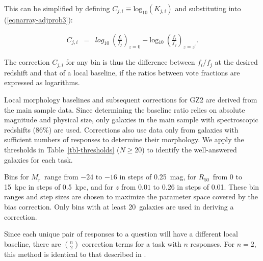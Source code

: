 \documentclass[useAMS,usenatbib]{mn2e}
\newcommand{\mr}{$M_r$}
\newcommand{\rfifty}{$R_{50}$}
\newcommand{\redshift}{$z$}
\begin{document}
\noindent This can be simplified by defining $C_{j,i}\equiv\text{log}_{10}(K_{j,i})$ and substituting into (\ref{eqnarray-adjprob3}):

\begin{eqnarray}
C_{j,i} &=& \text{$log_{10}$}~\left(\frac{f_i}{f_j}\right)_{z=0} - \text{log$_{10}$}~\left(\frac{f_i}{f_j}\right)_{z=z^\prime}.
\label{eqnarray-adjprob4}
\end{eqnarray}

\noindent The correction $C_{j,i}$ for any bin is thus the difference between $f_i/f_j$ at the desired redshift and that of a local baseline, if the ratios between vote fractions are expressed as logarithms.  

Local morphology baselines and subsequent corrections for GZ2 are derived from the main sample data. Since determining the baseline ratio relies on absolute magnitude and physical size, only galaxies in the main sample with spectroscopic redshifts (86\%) are used. Corrections also use data only from galaxies with sufficient numbers of responses to determine their morphology. We apply the thresholds in Table~\ref{tbl-thresholds} ($N\geq20$) to identify the well-answered galaxies for each task.

Bins for \mr~range from $-24$ to $-16$ in steps of 0.25~mag, for \rfifty~from 0 to 15~kpc in steps of 0.5~kpc, and for $z$ from $0.01$ to $0.26$ in steps of 0.01. These bin ranges and step sizes are chosen to maximize the parameter space covered by the bias correction. Only bins with at least 20~galaxies are used in deriving a correction. 

Since each unique pair of responses to a question will have a different local baseline, there are $\binom{n}{2}$ correction terms for a task with $n$ responses. For $n=2$, this method is identical to that described in \citet{bam09}. 
\end{document}
